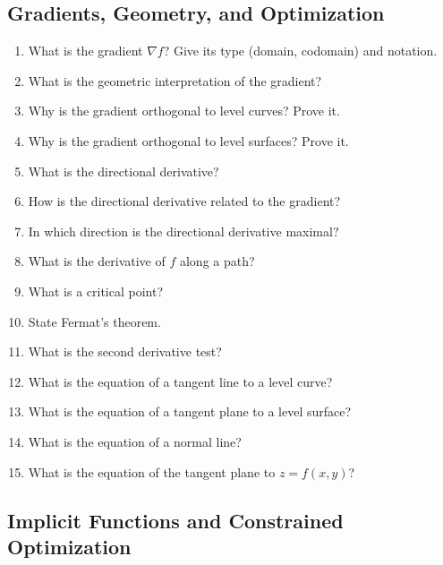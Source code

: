 \subsection{Gradients, Geometry, and Optimization}

\begin{enumerate}[resume]
  \item What is the gradient $\nabla f$? Give its type (domain, codomain) and notation.
  \item What is the geometric interpretation of the gradient?
  \item Why is the gradient orthogonal to level curves? Prove it.
  \item Why is the gradient orthogonal to level surfaces? Prove it.
  \item What is the directional derivative?
  \item How is the directional derivative related to the gradient?
  \item In which direction is the directional derivative maximal?
  \item What is the derivative of $f$ along a path?
  \item What is a critical point?
  \item State Fermat's theorem.
  \item What is the second derivative test?
  \item What is the equation of a tangent line to a level curve?
  \item What is the equation of a tangent plane to a level surface?
  \item What is the equation of a normal line?
  \item What is the equation of the tangent plane to $z=f(x,y)$?
\end{enumerate}

\subsection{Implicit Functions and Constrained Optimization}

